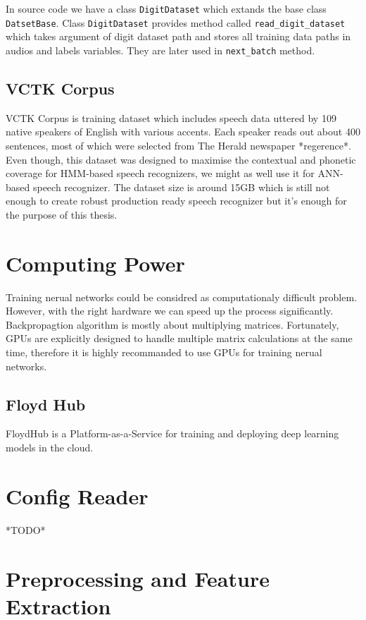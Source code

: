 In source code we have a class \texttt{DigitDataset} which extands the base class \texttt{DatsetBase}.
Class \texttt{DigitDataset} provides method called \texttt{read\_digit\_dataset} which takes argument of digit dataset path and stores all training data paths in audios and labels variables.
They are later used in \texttt{next\_batch} method.

\subsection{VCTK Corpus}

VCTK Corpus is training dataset which includes speech data uttered by 109 native speakers of English with various accents.
Each speaker reads out about 400 sentences, most of which were selected from The Herald newspaper *regerence*.
Even though, this dataset was designed to maximise the contextual and phonetic coverage for HMM-based speech recognizers, we might as well use it for ANN-based speech recognizer.
The dataset size is around 15GB which is still not enough to create robust production ready speech recognizer but it's enough for the purpose of this thesis.


\section{Computing Power}

Training nerual networks could be considred as computationaly difficult problem.
However, with the right hardware we can speed up the process significantly.
Backpropagtion algorithm is mostly about multiplying matrices.
Fortunately, GPUs are explicitly designed to handle multiple matrix calculations at the same time, therefore it is highly recommanded to use GPUs for training nerual networks.

\subsection{Floyd Hub}

FloydHub is a Platform-as-a-Service for training and deploying deep learning models in the cloud.


\section{Config Reader}

*TODO*


\section{Preprocessing and Feature Extraction}


